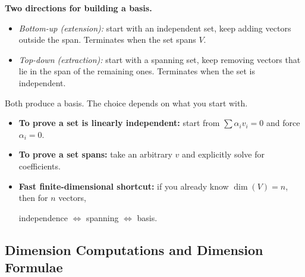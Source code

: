 \begin{keyformula}
\textbf{Two directions for building a basis.}
\begin{itemize}[leftmargin=*]
\item \emph{Bottom-up (extension):} start with an independent set, keep adding vectors outside the span.  Terminates when the set spans $V$.
\item \emph{Top-down (extraction):} start with a spanning set, keep removing vectors that lie in the span of the remaining ones.  Terminates when the set is independent.
\end{itemize}
Both produce a basis.  The choice depends on what you start with.
\end{keyformula}

\begin{examtip}

\begin{itemize}

\item \textbf{To prove a set is linearly independent:} start from $\sum \alpha_i v_i=0$ and force $\alpha_i=0$.

\item \textbf{To prove a set spans:} take an arbitrary $v$ and explicitly solve for coefficients.

\item \textbf{Fast finite-dimensional shortcut:} if you already know $\dim(V)=n$, then for $n$ vectors,

independence $\Longleftrightarrow$ spanning $\Longleftrightarrow$ basis.

\end{itemize}

\end{examtip}


\subsection{Dimension Computations and Dimension Formulae}


